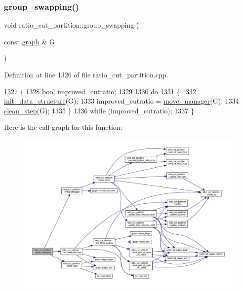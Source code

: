 \subsubsection{\texorpdfstring{group\+\_\+swapping()}{group\_swapping()}}
{\footnotesize\ttfamily void ratio\+\_\+cut\+\_\+partition\+::group\+\_\+swapping (\begin{DoxyParamCaption}\item[{const \mbox{\hyperlink{classgraph}{graph}} \&}]{G }\end{DoxyParamCaption})\hspace{0.3cm}{\ttfamily [protected]}}



Definition at line 1326 of file ratio\+\_\+cut\+\_\+partition.\+cpp.


\begin{DoxyCode}
1327 \{
1328     \textcolor{keywordtype}{bool} improved\_cutratio;
1329 
1330     \textcolor{keywordflow}{do}
1331     \{
1332     \mbox{\hyperlink{classratio__cut__partition_a53b8ad2845ed39cc2677721c747bdce6}{init\_data\_structure}}(G);
1333     improved\_cutratio = \mbox{\hyperlink{classratio__cut__partition_a16997844577ee3284a2b6fddbbea8c37}{move\_manager}}(G);
1334     \mbox{\hyperlink{classratio__cut__partition_aa8e1c0cce3f126e1aa4a3aa8489986fa}{clean\_step}}(G);
1335     \}
1336     \textcolor{keywordflow}{while} (improved\_cutratio);
1337 \}
\end{DoxyCode}
Here is the call graph for this function\+:\nopagebreak
\begin{figure}[H]
\begin{center}
\leavevmode
\includegraphics[width=350pt]{classratio__cut__partition_ae257dadc6cea5aef11badb68eadba0a5_cgraph}
\end{center}
\end{figure}
